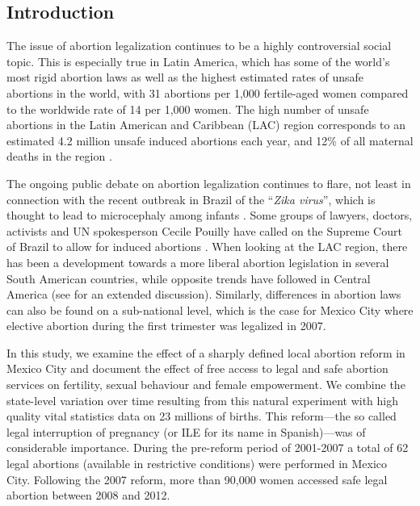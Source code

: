 \documentclass[a4paper,11pt]{article}
\begin{document}
\newpage 
\begin{spacing}{1.5}

\section{Introduction}
The issue of abortion legalization continues to be a highly controversial social topic.  This is especially true in Latin America, which has some of the world's most rigid abortion laws \citep{UN2014} as well as the highest estimated rates of unsafe abortions in the world, with 31 abortions per 1,000 fertile-aged women compared to the worldwide rate of 14 per 1,000 women. The high number of unsafe abortions in the Latin American and Caribbean (LAC) region corresponds to an estimated 4.2 million unsafe induced abortions each year, and 12\% of all maternal deaths in the region \citep{WHO2011}.

The ongoing public debate on abortion legalization continues to flare, not least in connection with the recent outbreak in Brazil of the ``\textit{Zika virus}'', which is thought to lead to microcephaly among infants \citep{heymann2016zika}. Some groups of lawyers, doctors, activists and UN spokesperson Cecile Pouilly have called on the Supreme Court of Brazil to allow for induced abortions \citep{guardianFeb}. When looking at the LAC region, there has been a development towards a more liberal abortion legislation in several South American countries, while opposite trends have followed in Central America (see \cite{Fraser2015} for an extended discussion). Similarly, differences in abortion laws can also be found on a sub-national level, which is the case for Mexico City where elective abortion during the first trimester was legalized in 2007.


In this study, we examine the effect of a sharply defined local abortion reform in Mexico City and document the effect of free access to legal and safe abortion services on fertility, sexual behaviour and female empowerment. We combine the state-level variation over time resulting from this natural experiment with high quality vital statistics data on 23 millions of births.  This reform---the so called legal interruption of pregnancy (or ILE for its name in Spanish)---was of considerable importance.  During the pre-reform period of 2001-2007 a total of 62 legal abortions (available in restrictive conditions) were performed in Mexico City.  Following the 2007 reform, more than 90,000 women accessed safe legal abortion between 2008 and 2012.


\end{spacing}
\end{document}
